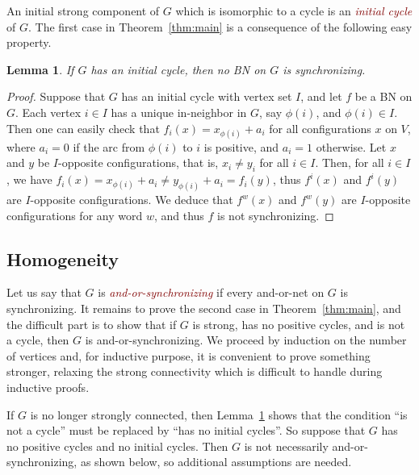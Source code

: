 \documentclass[11pt,letter]{article}
\newtheorem{lemma}{Lemma}
\newcommand{\EM}[1]{{\em\textcolor{Maroon}{#1}}}
\begin{document}
An initial strong component of $G$ which is isomorphic to a cycle is an \EM{initial cycle} of $G$. The first case in Theorem~\ref{thm:main} is a consequence of the following easy property.

\begin{lemma}\label{lem:initial_cycle}
If $G$ has an initial cycle, then no BN on $G$ is synchronizing.
\end{lemma} 

\begin{proof}
Suppose that $G$ has an initial cycle with vertex set $I$, and let $f$ be a BN on $G$. Each vertex $i\in I$ has a unique in-neighbor  in $G$, say $\phi(i)$, and $\phi(i)\in I$. Then one can easily check that $f_i(x)=x_{\phi(i)}+a_i$ for all configurations $x$ on $V$, where $a_i=0$ if the arc from $\phi(i)$ to $i$ is positive, and $a_i=1$ otherwise. Let $x$ and $y$ be $I$-opposite configurations, that is, $x_i\neq y_i$ for all $i\in I$. Then, for all $i\in I$, we have $f_i(x)=x_{\phi(i)}+a_i\neq y_{\phi(i)}+a_i=f_i(y)$, thus $f^i(x)$ and $f^i(y)$ are $I$-opposite configurations. We deduce that $f^w(x)$ and $f^w(y)$ are $I$-opposite configurations for any word $w$, and thus $f$ is not synchronizing. 
\end{proof}

\subsection{Homogeneity}

Let us say that $G$ is \EM{and-or-synchronizing} if every and-or-net on $G$ is synchronizing. It remains to prove the second case in Theorem~\ref{thm:main}, and the difficult part is to show that if $G$ is strong, has no positive cycles, and is not a cycle, then $G$ is and-or-synchronizing. We proceed by induction on the number of vertices and, for inductive purpose, it is convenient to prove something stronger, relaxing the strong connectivity which is difficult to handle during inductive proofs.  

\medskip
If $G$ is no longer strongly connected, then Lemma~\ref{lem:initial_cycle} shows that the condition ``is not a cycle'' must be replaced by ``has no initial cycles''. So suppose that $G$ has no positive cycles and no initial cycles. Then $G$ is not necessarily and-or-synchronizing, as shown below, so additional assumptions are needed. 
\end{document}
